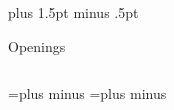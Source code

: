 \documentclass[fourcolor]{bridgesheet}
\newcommand\expandspaces[1]{%
  \spaceskip=\fontdimen2\font plus \fontdimen3\font minus \fontdimen4\font
  \xspaceskip=\fontdimen7\font
  \advance\spaceskip0pt plus#1\gluestretch\spaceskip
}
\newcommand\expandlines[1]{%
  \advance\baselineskip 0pt #1\relax
}
\newcommand\expandspacescurrentfont[1]{%
  \fontdimen3\font=\dimexpr\fontdimen3\font*\numexpr(1+#1)\relax
}
\begin{document}





\expandlines{plus 1.5pt minus .5pt}

\begin{sheet}{Openings}

\begin{columns}{3}
\begin{column}%
  \lipsum[1-2]
  \lipsum[3]
\end{column}
\end{columns}

\vskip 2pc
\begin{columns}{3}

\spaceskip=\font plus \font minus \font
\xspaceskip=\font plus \font minus \font

\begin{column}%
  \lipsum[1-2]
  \lipsum[3]
\end{column}
\end{columns}

\end{sheet}
\end{document}
